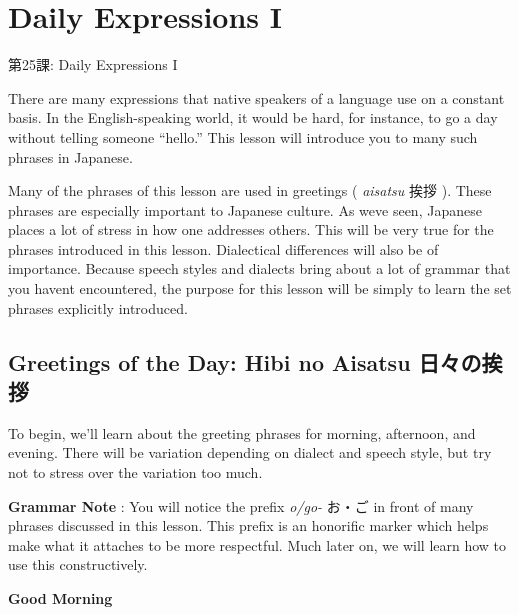     
\chapter{Daily Expressions I}

\begin{center}
\begin{Large}
第25課: Daily Expressions I 
\end{Large}
\end{center}
 
\par{There are many expressions that native speakers of a language use on a constant basis. In the English-speaking world, it would be hard, for instance, to go a day without telling someone “hello.” This lesson will introduce you to many such phrases in Japanese. }

\par{Many of the phrases of this lesson are used in greetings ( \emph{aisatsu } 挨拶 ). These phrases are especially important to Japanese culture. As we\textquotesingle ve seen, Japanese places a lot of stress in how one addresses others. This will be very true for the phrases introduced in this lesson. Dialectical differences will also be of importance. Because speech styles and dialects bring about a lot of grammar that you haven\textquotesingle t encountered, the purpose for this lesson will be simply to learn the set phrases explicitly introduced. }
      
\section{Greetings of the Day: Hibi no Aisatsu 日々の挨拶}
 
\par{ To begin, we'll learn about the greeting phrases for morning, afternoon, and evening. There will be variation depending on dialect and speech style, but try not to stress over the variation too much. }

\par{\textbf{Grammar Note }: You will notice the prefix \emph{o\slash go- }お・ご in front of many phrases discussed in this lesson. This prefix is an honorific marker which helps make what it attaches to be more respectful. Much later on, we will learn how to use this constructively. }

\begin{center}
\textbf{Good Morning }
\end{center}

